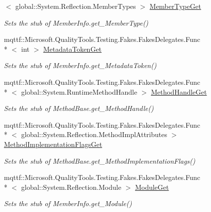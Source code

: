\begin{DoxyCompactItemize}
$<$ global\-::\-System.\-Reflection.\-Member\-Types $>$ \hyperlink{class_system_1_1_reflection_1_1_fakes_1_1_stub_method_base_aa0e3dfdce222e3b5cc267cc07abcf459}{Member\-Type\-Get}
\begin{DoxyCompactList}\small\item\em Sets the stub of Member\-Info.\-get\-\_\-\-Member\-Type()\end{DoxyCompactList}\item 
mqttf\-::\-Microsoft.\-Quality\-Tools.\-Testing.\-Fakes.\-Fakes\-Delegates.\-Func\\*
$<$ int $>$ \hyperlink{class_system_1_1_reflection_1_1_fakes_1_1_stub_method_base_a7dabc70305445b12b812375decf0eba0}{Metadata\-Token\-Get}
\begin{DoxyCompactList}\small\item\em Sets the stub of Member\-Info.\-get\-\_\-\-Metadata\-Token()\end{DoxyCompactList}\item 
mqttf\-::\-Microsoft.\-Quality\-Tools.\-Testing.\-Fakes.\-Fakes\-Delegates.\-Func\\*
$<$ global\-::\-System.\-Runtime\-Method\-Handle $>$ \hyperlink{class_system_1_1_reflection_1_1_fakes_1_1_stub_method_base_ad93d0100b5faf9e608c6f8733e4d5b08}{Method\-Handle\-Get}
\begin{DoxyCompactList}\small\item\em Sets the stub of Method\-Base.\-get\-\_\-\-Method\-Handle()\end{DoxyCompactList}\item 
mqttf\-::\-Microsoft.\-Quality\-Tools.\-Testing.\-Fakes.\-Fakes\-Delegates.\-Func\\*
$<$ global\-::\-System.\-Reflection.\-Method\-Impl\-Attributes $>$ \hyperlink{class_system_1_1_reflection_1_1_fakes_1_1_stub_method_base_a603549b4fdee7048bc99066d2adff64b}{Method\-Implementation\-Flags\-Get}
\begin{DoxyCompactList}\small\item\em Sets the stub of Method\-Base.\-get\-\_\-\-Method\-Implementation\-Flags()\end{DoxyCompactList}\item 
mqttf\-::\-Microsoft.\-Quality\-Tools.\-Testing.\-Fakes.\-Fakes\-Delegates.\-Func\\*
$<$ global\-::\-System.\-Reflection.\-Module $>$ \hyperlink{class_system_1_1_reflection_1_1_fakes_1_1_stub_method_base_ab83436d9d4eb967da715b07e3c85d26d}{Module\-Get}
\begin{DoxyCompactList}\small\item\em Sets the stub of Member\-Info.\-get\-\_\-\-Module()\end{DoxyCompactList}\item 

\end{DoxyCompactItemize}
